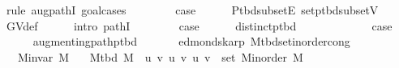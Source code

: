 \begin{isabellebody}
\ {\isacharparenleft}{\kern0pt}rule\ augpathI{\isacharcomma}{\kern0pt}\ goal{\isacharunderscore}{\kern0pt}cases{\isacharparenright}{\kern0pt}\isanewline
\ \ \isamarkupfalse%
\ {}\isanewline
\ \ \isamarkupfalse%
\ {\isacharquery}{\kern0pt}case\isanewline
\ \ \ \ \isamarkupfalse%
\ P{\isacharunderscore}{\kern0pt}tbd{\isacharunderscore}{\kern0pt}subset{\isacharunderscore}{\kern0pt}E\ set{\isacharunderscore}{\kern0pt}p{\isacharunderscore}{\kern0pt}tbd{\isacharunderscore}{\kern0pt}subset{\isacharunderscore}{\kern0pt}V\isanewline
\ \ \ \ \isamarkupfalse%
\ G{\isachardot}{\kern0pt}V{\isacharunderscore}{\kern0pt}def\isanewline
\ \ \ \ \isamarkupfalse%
\ {\isacharparenleft}{\kern0pt}intro\ pathI{\isacharparenright}{\kern0pt}\isanewline
{}\isamarkupfalse%
\isanewline
\ \ \isamarkupfalse%
\ {}\isanewline
\ \ \isamarkupfalse%
\ {\isacharquery}{\kern0pt}case\isanewline
\ \ \ \ \isamarkupfalse%
\ distinct{\isacharunderscore}{\kern0pt}p{\isacharunderscore}{\kern0pt}tbd\isanewline
\ \ \ \ \isacommand{{\isachardot}{\kern0pt}}\isamarkupfalse%
\isanewline
{}\isamarkupfalse%
\isanewline
\ \ \isamarkupfalse%
\ {}\isanewline
\ \ \isamarkupfalse%
\ {\isacharquery}{\kern0pt}case\isanewline
\ \ \ \ \isamarkupfalse%
\ augmenting{\isacharunderscore}{\kern0pt}path{\isacharunderscore}{\kern0pt}p{\isacharunderscore}{\kern0pt}tbd\isanewline
\ \ \ \ \isacommand{{\isachardot}{\kern0pt}}\isamarkupfalse%
\isanewline
{}\isamarkupfalse%
%
\endisatagproof
{\isafoldproof}%
%
\isadelimproof
\isanewline
%
\endisadelimproof
%
\isadeliminvisible
\isanewline
%
\endisadeliminvisible
%
\isataginvisible
{}\isamarkupfalse%
\ {\isacharparenleft}{\kern0pt}\ edmonds{\isacharunderscore}{\kern0pt}karp{\isacharparenright}{\kern0pt}\ M{\isacharunderscore}{\kern0pt}tbd{\isacharunderscore}{\kern0pt}set{\isacharunderscore}{\kern0pt}inorder{\isacharunderscore}{\kern0pt}cong{\isacharcolon}{\kern0pt}\isanewline
\ \ \ {\isachardoublequoteopen}M{\isachardot}{\kern0pt}invar\ M{\isachardoublequoteclose}\isanewline
\ \ \ {\isachardoublequoteopen}M{\isacharunderscore}{\kern0pt}tbd\ M\ {\isacharequal}{\kern0pt}\ {\isacharbraceleft}{\kern0pt}{\isacharbraceleft}{\kern0pt}u{\isacharcomma}{\kern0pt}\ v{\isacharbraceright}{\kern0pt}\ {\isacharbar}{\kern0pt}u\ v{\isachardot}{\kern0pt}\ {\isacharparenleft}{\kern0pt}u{\isacharcomma}{\kern0pt}\ v{\isacharparenright}{\kern0pt}\ {\isasymin}\ set\ {\isacharparenleft}{\kern0pt}M{\isacharunderscore}{\kern0pt}inorder\ M{\isacharparenright}{\kern0pt}{\isacharbraceright}{\kern0pt}{\isachardoublequoteclose}%

\end{isabellebody}
